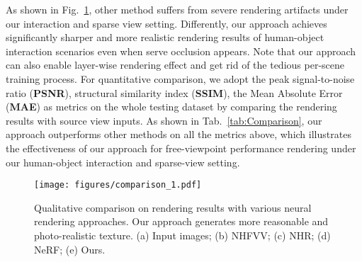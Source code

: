 %
As shown in Fig.~\ref{fig:comparsion}, other method suffers from severe rendering artifacts under our interaction and sparse view setting.
%
Differently, our approach achieves significantly sharper and more realistic rendering results of human-object interaction scenarios even when serve occlusion appears.
%
Note that our approach can also enable layer-wise rendering effect and get rid of the tedious per-scene training process.
%
For quantitative comparison, we adopt the peak signal-to-noise ratio (\textbf{PSNR}), structural similarity index (\textbf{SSIM}), the Mean Absolute Error (\textbf{MAE}) as metrics on the whole testing dataset by comparing the rendering results with source view inputs.
%
As shown in Tab.~\ref{tab:Comparison}, our approach outperforms other methods on all the metrics above, which illustrates the effectiveness of our approach for free-viewpoint performance rendering under our human-object interaction and sparse-view setting.

\begin{figure}[t]
	\centering
	\texttt{[image: figures/comparison\_1.pdf]}
	\caption{Qualitative comparison on rendering results with various neural rendering approaches. Our approach generates more reasonable and photo-realistic texture. (a) Input images; (b) NHFVV; (c) NHR; (d) NeRF; (e) Ours.}
    \vspace{-10pt}
	\label{fig:comparsion}
\end{figure}

\begin{table}[t]
	\begin{center}
		\centering
		\caption{Quantitative comparison against various neural rendering methods on the rendering results. Our method achieves consistently better metric results.}
		\vspace{-10pt}
		\label{tab:Comparison}
	\end{center}
\end{table}



